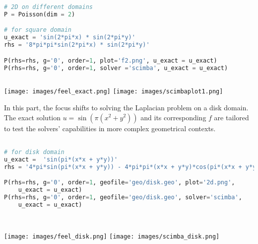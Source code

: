 \documentclass[12pt]{article}
\begin{document}
\begin{lstlisting}[language=Python,caption={},frame=single, backgroundcolor=\color{gray!10}, basicstyle=\footnotesize,rulecolor=\color{blue}, framexleftmargin=3pt, commentstyle=\color{mygreen}, keywordstyle=\color{blue}]
# 2D on different domains
P = Poisson(dim = 2)

# for square domain
u_exact = 'sin(2*pi*x) * sin(2*pi*y)'
rhs = '8*pi*pi*sin(2*pi*x) * sin(2*pi*y)'

P(rhs=rhs, g='0', order=1, plot='f2.png', u_exact = u_exact)
P(rhs=rhs, g='0', order=1, solver ='scimba', u_exact = u_exact)
    
\end{lstlisting}


\begin{frame}{}
    \begin{center}
        \texttt{[image: images/feel\_exact.png]}
        \texttt{[image: images/scimbaplot1.png]}

    \end{center}
\end{frame}

\newpage

In this part, the focus shifts to solving the Laplacian problem on a disk domain. The exact solution \( u = \sin(\pi(x^2 + y^2)) \) and its corresponding \( f \) are tailored to test the solvers' capabilities in more complex geometrical contexts.

\begin{lstlisting}[language=Python,caption={},frame=single, backgroundcolor=\color{gray!10}, basicstyle=\footnotesize,rulecolor=\color{blue}, framexleftmargin=3pt, commentstyle=\color{mygreen}, keywordstyle=\color{blue}]

# for disk domain
u_exact =  'sin(pi*(x*x + y*y))'
rhs = '4*pi*sin(pi*(x*x + y*y)) - 4*pi*pi*(x*x + y*y)*cos(pi*(x*x + y*y))'

P(rhs=rhs, g='0', order=1, geofile='geo/disk.geo', plot='2d.png', 
    u_exact = u_exact)
P(rhs=rhs, g='0', order=1, geofile='geo/disk.geo', solver='scimba', 
    u_exact = u_exact)

    
\end{lstlisting}

\begin{frame}{}
    \begin{center}
        \texttt{[image: images/feel\_disk.png]}
        \texttt{[image: images/scimba\_disk.png]}

    \end{center}
\end{frame}
\end{document}
